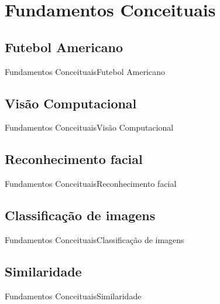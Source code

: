 \section{Fundamentos Conceituais}

\subsection{Futebol Americano}
\begin{frame}{Fundamentos Conceituais}{Futebol Americano}

\end{frame}

\subsection{Visão Computacional}
\begin{frame}{Fundamentos Conceituais}{Visão Computacional}

\end{frame}

\subsection{Reconhecimento facial}
\begin{frame}{Fundamentos Conceituais}{Reconhecimento facial}

\end{frame}

\subsection{Classificação de imagens}
\begin{frame}{Fundamentos Conceituais}{Classificação de imagens}

\end{frame}

\subsection{Similaridade}
\begin{frame}{Fundamentos Conceituais}{Similaridade}

\end{frame}